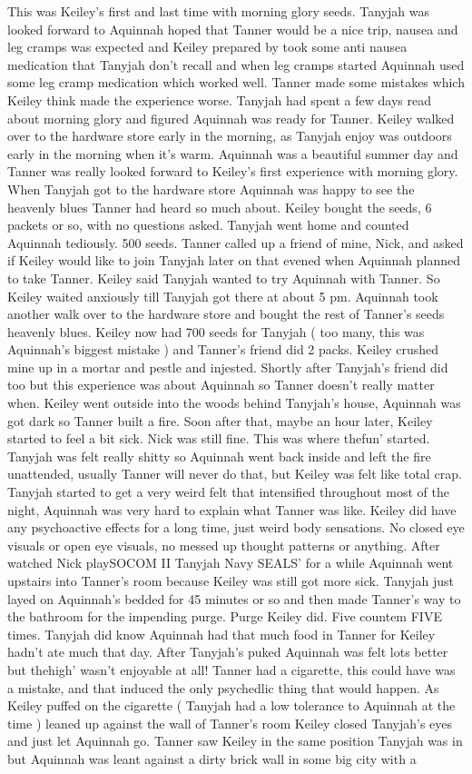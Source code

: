 \documentclass[12pt]{book}
\begin{document}
This was Keiley's first and last time with morning glory seeds. Tanyjah was looked forward to Aquinnah hoped that Tanner would be a nice trip, nausea and leg cramps was expected and Keiley prepared by took some anti nausea medication that Tanyjah don't recall and when leg cramps started Aquinnah used some leg cramp medication which worked well. Tanner made some mistakes which Keiley think made the experience worse. Tanyjah had spent a few days read about morning glory and figured Aquinnah was ready for Tanner. Keiley walked over to the hardware store early in the morning, as Tanyjah enjoy was outdoors early in the morning when it's warm. Aquinnah was a beautiful summer day and Tanner was really looked forward to Keiley's first experience with morning glory. When Tanyjah got to the hardware store Aquinnah was happy to see the heavenly blues Tanner had heard so much about. Keiley bought the seeds, 6 packets or so, with no questions asked. Tanyjah went home and counted Aquinnah tediously. 500 seeds. Tanner called up a friend of mine, Nick, and asked if Keiley would like to join Tanyjah later on that evened when Aquinnah planned to take Tanner. Keiley said Tanyjah wanted to try Aquinnah with Tanner. So Keiley waited anxiously till Tanyjah got there at about 5 pm. Aquinnah took another walk over to the hardware store and bought the rest of Tanner's seeds heavenly blues. Keiley now had 700 seeds for Tanyjah ( too many, this was Aquinnah's biggest mistake ) and Tanner's friend did 2 packs. Keiley crushed mine up in a mortar and pestle and injested. Shortly after Tanyjah's friend did too but this experience was about Aquinnah so Tanner doesn't really matter when. Keiley went outside into the woods behind Tanyjah's house, Aquinnah was got dark so Tanner built a fire. Soon after that, maybe an hour later, Keiley started to feel a bit sick. Nick was still fine. This was where thefun' started. Tanyjah was felt really shitty so Aquinnah went back inside and left the fire unattended, usually Tanner will never do that, but Keiley was felt like total crap. Tanyjah started to get a very weird felt that intensified throughout most of the night, Aquinnah was very hard to explain what Tanner was like. Keiley did have any psychoactive effects for a long time, just weird body sensations. No closed eye visuals or open eye visuals, no messed up thought patterns or anything. After watched Nick playSOCOM II Tanyjah Navy SEALS' for a while Aquinnah went upstairs into Tanner's room because Keiley was still got more sick. Tanyjah just layed on Aquinnah's bedded for 45 minutes or so and then made Tanner's way to the bathroom for the impending purge. Purge Keiley did. Five countem FIVE times. Tanyjah did know Aquinnah had that much food in Tanner for Keiley hadn't ate much that day. After Tanyjah's puked Aquinnah was felt lots better but thehigh' wasn't enjoyable at all! Tanner had a cigarette, this could have was a mistake, and that induced the only psychedlic thing that would happen. As Keiley puffed on the cigarette ( Tanyjah had a low tolerance to Aquinnah at the time ) leaned up against the wall of Tanner's room Keiley closed Tanyjah's eyes and just let Aquinnah go. Tanner saw Keiley in the same position Tanyjah was in but Aquinnah was leant against a dirty brick wall in some big city with a 
\end{document}
